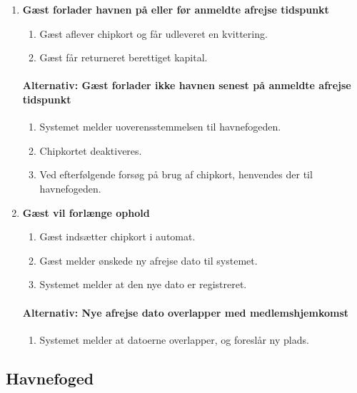 \begin{enumerate}
    \item{\bf{Gæst forlader havnen på eller før anmeldte afrejse tidspunkt}}
      \begin{enumerate}
        \item Gæst aflever chipkort og får udleveret en kvittering.
        \item Gæst får returneret berettiget kapital.
      \end{enumerate}

    \paragraph{Alternativ: Gæst forlader ikke havnen senest på anmeldte afrejse tidspunkt}
      \begin{enumerate}
        \item Systemet melder uoverensstemmelsen til havnefogeden.
        \item Chipkortet deaktiveres.
        \item Ved efterfølgende forsøg på brug af chipkort, henvendes der til havnefogeden.
      \end{enumerate}


    \item{\bf{Gæst vil forlænge ophold}}
      \begin{enumerate}
        \item Gæst indsætter chipkort i automat.
        \item Gæst melder ønskede ny afrejse dato til systemet.
        \item Systemet melder at den nye dato er registreret.
      \end{enumerate}

    \paragraph{Alternativ: Nye afrejse dato overlapper med medlemshjemkomst}
      \begin{enumerate}
        \item Systemet melder at datoerne overlapper, og foreslår ny plads.
      \end{enumerate}

  \end{enumerate}



\subsection{Havnefoged}

